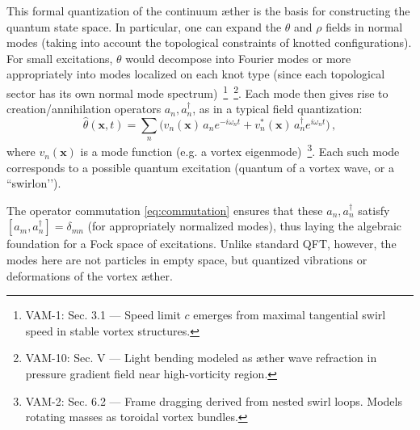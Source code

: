 \documentclass[a4paper,12pt]{article}
\begin{document}
    This formal quantization of the continuum æther is the basis for constructing the quantum state space. In particular, one can expand the $\theta$ and $\rho$ fields in normal modes (taking into account the topological constraints of knotted configurations). For small excitations, $\theta$ would decompose into Fourier modes or more appropriately into modes localized on each knot type (since each topological sector has its own normal mode spectrum)~\footnote{VAM-1: Sec. 3.1 — Speed limit $c$ emerges from maximal tangential swirl speed in stable vortex structures.}~\footnote{VAM-10: Sec. V — Light bending modeled as æther wave refraction in pressure gradient field near high-vorticity region.}. Each mode then gives rise to creation/annihilation operators $a_n, a_n^\dagger$, as in a typical field quantization:
    \[
        \hat{\theta}(\mathbf{x},t) = \sum_n \big( v_n(\mathbf{x})\,a_n e^{-i\omega_n t} + v_n^*(\mathbf{x})\,a_n^\dagger e^{i\omega_n t}\big)\,,
    \]
    where $v_n(\mathbf{x})$ is a mode function (e.g. a vortex eigenmode)~\footnote{VAM-2: Sec. 6.2 — Frame dragging derived from nested swirl loops. Models rotating masses as toroidal vortex bundles.}. Each such mode corresponds to a possible quantum excitation (quantum of a vortex wave, or a ``swirlon’’).

    The operator commutation \eqref{eq:commutation} ensures that these $a_n, a_n^\dagger$ satisfy $[a_m, a_n^\dagger] = \delta_{mn}$ (for appropriately normalized modes), thus laying the algebraic foundation for a Fock space of excitations. Unlike standard QFT, however, the modes here are not particles in empty space, but quantized vibrations or deformations of the vortex æther.
\end{document}
